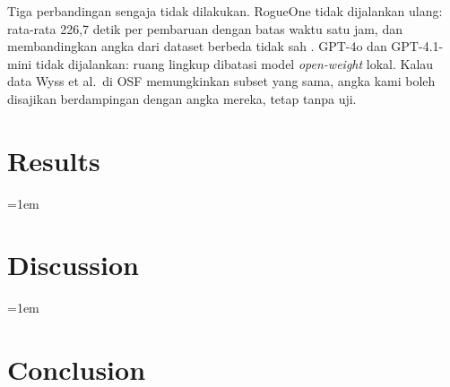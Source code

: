 \documentclass[a4paper,fleqn]{cas-dc}
\begin{document}
Tiga perbandingan sengaja tidak dilakukan. RogueOne tidak dijalankan ulang:
rata-rata 226,7 detik per pembaruan dengan batas waktu satu jam, dan
membandingkan angka dari dataset berbeda tidak sah
\citep{sofaer2024rogueone}. GPT-4o dan GPT-4.1-mini tidak dijalankan: ruang
lingkup dibatasi model \emph{open-weight} lokal. Kalau data Wyss et al.\ di OSF
memungkinkan subset yang sama, angka kami boleh disajikan berdampingan dengan
angka mereka, tetap tanpa uji.

\section{Results}\label{sec:results}

\begingroup
\emergencystretch=1em

\par
\endgroup

\section{Discussion}\label{sec:discussion}

\begingroup
\emergencystretch=1em

\par
\endgroup

\section{Conclusion}\label{sec:conclusion}

\printcredits



\end{document}
